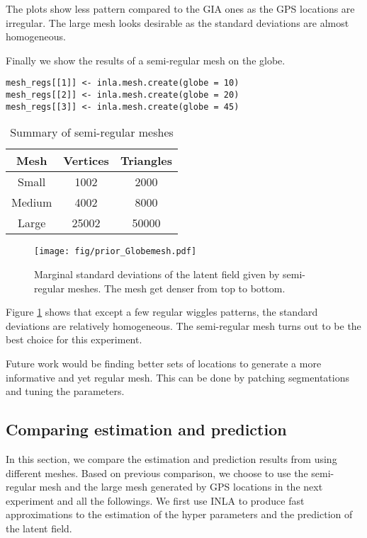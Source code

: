 \documentclass[a4paper,12pt]{article}
\begin{document}
The plots show less pattern compared to the GIA ones as the GPS locations are irregular. The large mesh looks desirable as the standard deviations are almost homogeneous.

Finally we show the results of a semi-regular mesh on the globe.
\begin{verbatim}
mesh_regs[[1]] <- inla.mesh.create(globe = 10)
mesh_regs[[2]] <- inla.mesh.create(globe = 20)
mesh_regs[[3]] <- inla.mesh.create(globe = 45)
\end{verbatim}

\begin{table}[htbp] 
\centering
\caption{Summary of semi-regular meshes}\label{tab:reg_mesh}
\begin{tabular}{ c| c c }
\hline
 Mesh     & Vertices & Triangles \\\hline
 Small  &  1002 & 2000 \\ 
 Medium &  4002 & 8000 \\  
 Large  & 25002 & 50000 \\   \hline
\end{tabular}
\end{table}

\begin{figure}[htbp]
 \begin{center}
 \texttt{[image: fig/prior\_Globemesh.pdf]}
 \end{center}
 \caption[Semi-regular mesh]{Marginal standard deviations of the latent field given by semi-regular meshes. The mesh get denser from top to bottom.}
 \label{fig:reg_mesh}
 \end{figure}
Figure \ref{fig:reg_mesh} shows that except a few regular wiggles patterns, the standard deviations are relatively homogeneous. The semi-regular mesh turns out to be the best choice for this experiment.

Future work would be finding better sets of locations to generate a more informative and yet regular mesh. This can be done by patching segmentations and tuning the parameters.
 
\subsection{Comparing estimation and prediction}
In this section, we compare the estimation and prediction results from using different meshes. Based on previous comparison, we choose to use the semi-regular mesh and the large mesh generated by GPS locations in the next experiment and all the followings. We first use INLA to produce fast approximations to the estimation of the hyper parameters and the prediction of the latent field.
\end{document}
